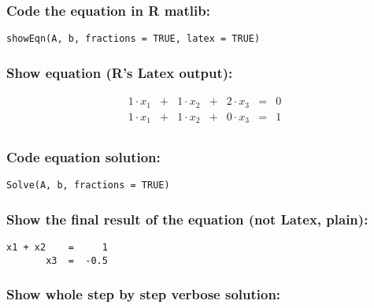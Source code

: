 \documentclass[
  10pt,
  a4paper,
]{article}
\begin{document}
\hypertarget{code-the-equation-in-r-matlib}{%
\subsubsection{Code the equation in R
matlib:}\label{code-the-equation-in-r-matlib}}

\begin{verbatim}
showEqn(A, b, fractions = TRUE, latex = TRUE)
\end{verbatim}

\hypertarget{show-equation-rs-latex-output}{%
\subsubsection{Show equation (R's Latex
output):}\label{show-equation-rs-latex-output}}

\[
\begin{array}{lllllll}
1 \cdot x_1 &+& 1 \cdot x_2 &+& 2 \cdot x_3  &=&  0 \\ 
1 \cdot x_1 &+& 1 \cdot x_2 &+& 0 \cdot x_3  &=&  1 \\ 
\end{array}
\]

\hypertarget{code-equation-solution}{%
\subsubsection{Code equation solution:}\label{code-equation-solution}}

\begin{verbatim}
Solve(A, b, fractions = TRUE)
\end{verbatim}

\hypertarget{show-the-final-result-of-the-equation-not-latex-plain}{%
\subsubsection{Show the final result of the equation (not Latex,
plain):}\label{show-the-final-result-of-the-equation-not-latex-plain}}

\begin{verbatim}
x1 + x2    =     1 
       x3  =  -0.5 
\end{verbatim}

\hypertarget{show-whole-step-by-step-verbose-solution}{%
\subsubsection{Show whole step by step verbose
solution:}\label{show-whole-step-by-step-verbose-solution}}
\end{document}
